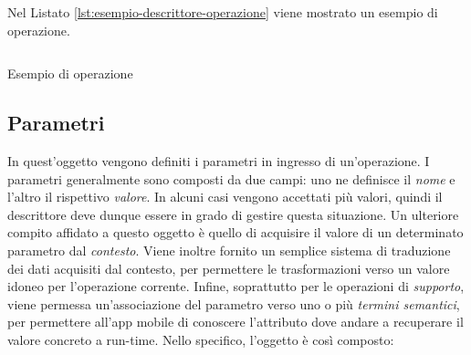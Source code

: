 Nel Listato \ref{lst:esempio-descrittore-operazione} viene mostrato un esempio di operazione.

\begin{listing}[H]
	\inputminted{json}{5-implementazione-backend/Codice/esempio_descrittore_operazione.json}
	\caption{Esempio di operazione}
	\label{lst:esempio-descrittore-operazione}
\end{listing}

\subsection{Parametri\label{sec:descrittore-parametri}}

In quest'oggetto vengono definiti i parametri in ingresso di un'operazione. I parametri generalmente sono composti da due campi: uno ne definisce il \emph{nome} e l'altro il rispettivo \emph{valore}. In alcuni casi vengono accettati più valori, quindi il descrittore deve dunque essere in grado di gestire questa situazione. Un ulteriore compito affidato a questo oggetto è quello di acquisire il valore di un determinato parametro dal \emph{contesto}. Viene inoltre fornito un semplice sistema di traduzione dei dati acquisiti dal contesto, per permettere le trasformazioni verso un valore idoneo per l'operazione corrente. Infine, soprattutto per le operazioni di \emph{supporto}, viene permessa un'associazione del parametro verso uno o più \emph{termini semantici}, per permettere all'app mobile di conoscere l'attributo dove andare a recuperare il valore concreto a run-time. Nello specifico, l'oggetto è così composto:

